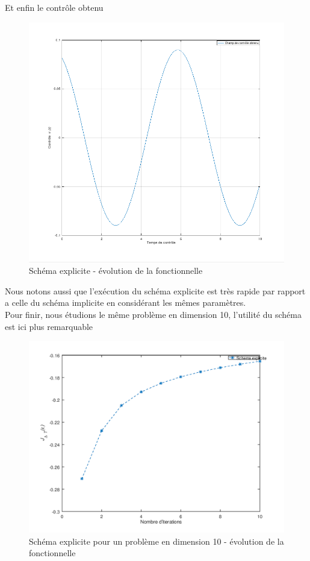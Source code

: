 Et enfin le contrôle obtenu
\begin{figure}[H]
	\caption{Schéma explicite - évolution de la fonctionnelle}
	\centering
	\includegraphics[scale=0.5]{images/explicit_c.png}
\end{figure}
Nous notons aussi que l'exécution du schéma explicite est très rapide par rapport a celle du schéma implicite en considérant les mêmes paramètres.\\
Pour finir, nous étudions le même problème en dimension 10, l'utilité du schéma est ici plus remarquable
\begin{figure}[H]
	\caption{Schéma explicite pour un problème en dimension 10 - évolution de la fonctionnelle}
	\centering
	\includegraphics[scale=0.7]{images/explicitdim10_func.png}
\end{figure}